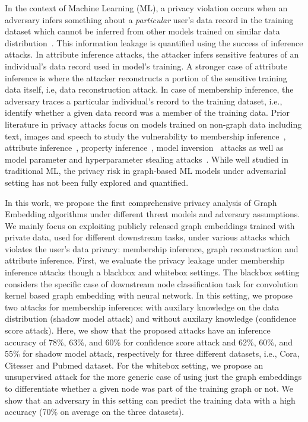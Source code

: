 In the context of Machine Learning (ML), a privacy violation occurs when an adversary infers something about a \textit{particular} user's data record in the training dataset which cannot be inferred from other models trained on similar data distribution~\cite{membershipinf,whitebox}.
This information leakage is quantified using the success of inference attacks. %
In attribute inference attacks, the attacker infers sensitive features of an individual's data record used in model's training.
A stronger case of attribute inference is where the attacker reconstructs a portion of the sensitive training data itself, i.e, data reconstruction attack.
In case of membership inference, the adversary traces a particular individual's record to the training dataset, i.e., identify whether a given data record was a member of the training data.
Prior literature in privacy attacks focus on models trained on non-graph data including text, images and speech to study the vulnerability to membership inference~\cite{ndss19salem,membershipinf}, attribute inference~\cite{attributeinf,attributeinf2}, property inference~\cite{propertyinf}, model inversion~\cite{modelinversion} attacks as well as model parameter and hyperparameter stealing attacks~\cite{timing,stealml,8418595}.
While well studied in traditional ML, the privacy risk in graph-based ML models under adversarial setting has not been fully explored and quantified. %


In this work, we propose the first comprehensive privacy analysis of Graph Embedding algorithms under different threat models and adversary assumptions.
We mainly focus on exploiting publicly released graph embeddings trained with private data, used for different downstream tasks, under various attacks which violates the user's data privacy: membership inference, graph reconstruction and attribute inference.
First, we evaluate the privacy leakage under membership inference attacks though a blackbox and whitebox settings.
The blackbox setting considers the specific case of downstream node classification task for convolution kernel based graph embedding with neural network. 
In this setting, we propose two attacks for membership inference: with auxilary knowledge on the data distribution (shadow model attack) and without auxilary knowledge (confidence score attack).
Here, we show that the proposed attacks have an inference accuracy of 78\%, 63\%, and 60\% for confidence score attack and 62\%, 60\%, and 55\% for shadow model attack, respectively for three different datasets, i.e., Cora, Citesser and Pubmed dataset.
For the whitebox setting, we propose an unsupervised attack for the more generic case of using just the graph embeddings to differentiate whether a given node was part of the training graph or not.
We show that an adversary in this setting can predict the training data with a high accuracy (70\% on average on the three datasets).

